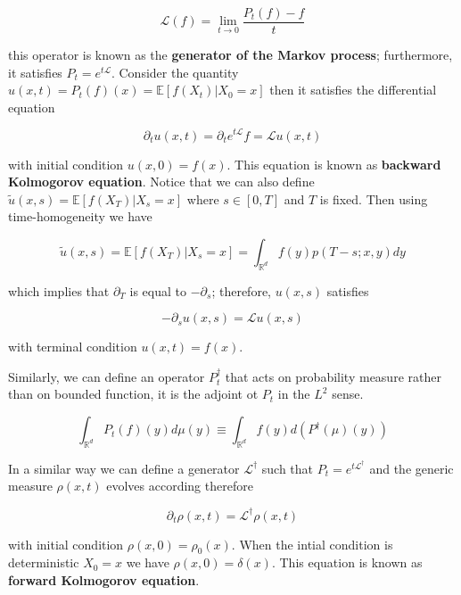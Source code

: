\documentclass[11pt,a4paper]{article}
\begin{document}
\begin{equation}
\mathcal{L}(f) = \lim_{t \to 0} \frac{P_t(f)-f}{t}    
\end{equation}

this operator is known as the \textbf{generator of the Markov process}; furthermore, it satisfies $P_t = e^{t \mathcal{L}}$. Consider the quantity $u(x,t) = P_t(f)(x)= \mathbb{E}[f(X_t)|X_0= x]$ then it satisfies the differential equation

\begin{equation}
    \partial_t u(x,t) = \partial_t e^{t \mathcal{L}}f = \mathcal{L}u(x,t)
\end{equation}

with initial condition $u(x,0) = f(x)$. 
This equation is known as \textbf{backward Kolmogorov equation}. Notice that we can also define $\tilde{u}(x,s) = \mathbb{E}[f(X_T)|X_s=x]$ where $s \in [0,T]$ and $T$ is fixed. Then using time-homogeneity we have

\begin{equation}
\tilde{u}(x,s) =  \mathbb{E}[f(X_T)|X_s=x] =   \int_{\mathbb{R}^d} f(y)p(T-s;x,y)dy  
\end{equation}

which implies that $\partial_T $ is equal to $-\partial_s$; therefore, $u(x,s)$ satisfies

\begin{equation}
    -\partial_su(x,s) = \mathcal{L}u(x,s)
\end{equation}

with terminal condition $u(x,t) = f(x)$.


Similarly, we can define an operator $P^{\dagger}_t$ that acts on probability measure rather than on bounded function, it is the adjoint ot $P_t$ in the $L^2$ sense.

\begin{equation}
   \int_{\mathbb{R}^d} P_t(f)(y)d\mu(y) \equiv   \int_{\mathbb{R}^d} f(y)d(P^{\dagger}(\mu)(y))
\end{equation}

In a similar way we can define a generator $\mathcal{L}^{\dagger}$ such that $P_t = e^{t \mathcal{L}^{\dagger}}$ and the generic measure $\rho(x,t)$ evolves according therefore

\begin{equation}
    \partial_t \rho(x,t) = \mathcal{L}^{\dagger}\rho(x,t)
\end{equation}

with initial condition $\rho(x,0) = \rho_0(x)$. When the intial condition is deterministic $X_0=x$ we have $\rho(x,0) = \delta(x)$. This equation is known as \textbf{forward Kolmogorov equation}.
\end{document}

